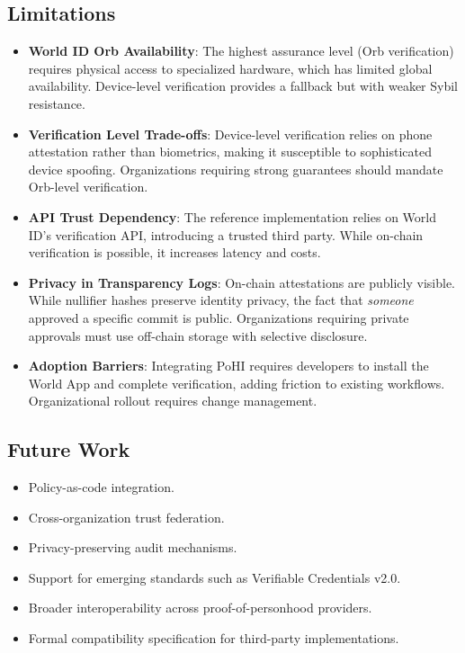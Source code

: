 \documentclass[conference]{IEEEtran}
\begin{document}
\subsection{Limitations}

\begin{itemize}
    \item \textbf{World ID Orb Availability}: The highest assurance level (Orb verification) requires physical access to specialized hardware, which has limited global availability. Device-level verification provides a fallback but with weaker Sybil resistance.
    \item \textbf{Verification Level Trade-offs}: Device-level verification relies on phone attestation rather than biometrics, making it susceptible to sophisticated device spoofing. Organizations requiring strong guarantees should mandate Orb-level verification.
    \item \textbf{API Trust Dependency}: The reference implementation relies on World ID's verification API, introducing a trusted third party. While on-chain verification is possible, it increases latency and costs.
    \item \textbf{Privacy in Transparency Logs}: On-chain attestations are publicly visible. While nullifier hashes preserve identity privacy, the fact that \textit{someone} approved a specific commit is public. Organizations requiring private approvals must use off-chain storage with selective disclosure.
    \item \textbf{Adoption Barriers}: Integrating PoHI requires developers to install the World App and complete verification, adding friction to existing workflows. Organizational rollout requires change management.
\end{itemize}

\subsection{Future Work}

\begin{itemize}
    \item Policy-as-code integration.
    \item Cross-organization trust federation.
    \item Privacy-preserving audit mechanisms.
    \item Support for emerging standards such as Verifiable Credentials v2.0.
    \item Broader interoperability across proof-of-personhood providers.
    \item Formal compatibility specification for third-party implementations.
\end{itemize}
\end{document}
